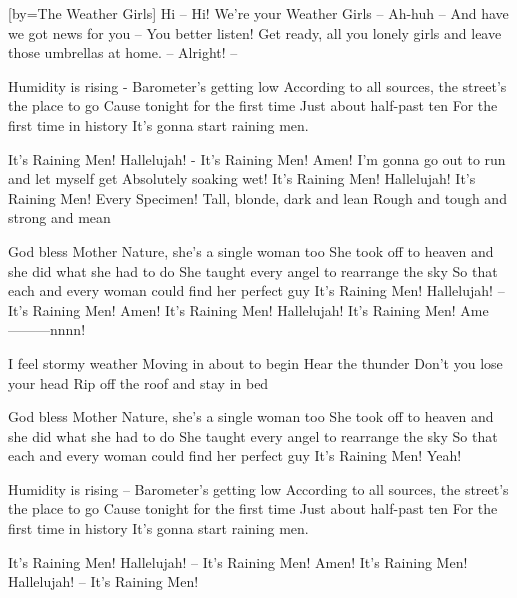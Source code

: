 [by={The Weather Girls}]
\beginverse
Hi -- Hi! We're your Weather Girls -- Ah-huh --
And have we got news for you -- You better listen!
Get ready, all you lonely girls
and leave those umbrellas at home. -- Alright! --
\endverse

\beginverse
Humidity is rising - Barometer's getting low
According to all sources, the street's the place to go
Cause tonight for the first time
Just about half-past ten
For the first time in history
It's gonna start raining men.
\endverse

\beginchorus
It's Raining Men! Hallelujah! - It's Raining Men! Amen!
I'm gonna go out to run and let myself get
Absolutely soaking wet!
It's Raining Men! Hallelujah!
It's Raining Men! Every Specimen!
Tall, blonde, dark and lean
Rough and tough and strong and mean
\endchorus

\beginchorus
God bless Mother Nature, she's a single woman too
She took off to heaven and she did what she had to do
She taught every angel to rearrange the sky
So that each and every woman could find her perfect guy
It's Raining Men! Hallelujah! -- It's Raining Men! Amen!
It's Raining Men! Hallelujah!
It's Raining Men! Ame---------nnnn!
\endchorus

\beginverse
I feel stormy weather
Moving in about to begin
Hear the thunder 
Don't you lose your head
Rip off the roof and stay in bed
\endverse

\beginverse
God bless Mother Nature, she's a single woman too
She took off to heaven and she did what she had to do
She taught every angel to rearrange the sky
So that each and every woman could find her perfect guy
It's Raining Men! Yeah!
\endverse

\beginverse
Humidity is rising -- Barometer's getting low
According to all sources, the street's the place to go
Cause tonight for the first time
Just about half-past ten
For the first time in history
It's gonna start raining men.
\endverse

\beginchorus
It's Raining Men! Hallelujah! -- It's Raining Men! Amen!
It's Raining Men! Hallelujah! -- It's Raining Men! 
\endchorus
\endsong